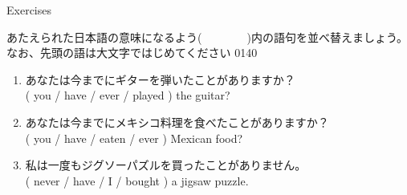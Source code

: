 \documentclass[aspectratio=169,xcolor={dvipsnames,table}]{beamer}
\newcommand{\myaudio}[1]{\href{#1}{\faVolumeUp}}
\begin{document}
\begin{frame}[plain]{Exercises}

{\small あたえられた日本語の意味になるよう(~~~~~~~~)内の語句を並べ替えましょう。なお、先頭の語は大文字ではじめてください}%
\hfill{\tiny 0140}\,{\scriptsize \myaudio{./audio/013_have_pp_keiken_05.mp3}}

\vspace{-10pt}
 \begin{enumerate}
  \item あなたは今までにギターを弾いたことがありますか？\\
( you / have / ever / played ) the guitar?\\
\vspace{-10pt}
  \item あなたは今までにメキシコ料理を食べたことがありますか？\hfill{}\,\,\\
( you / have / eaten / ever ) Mexican food?\\
  \item 私は一度もジグソーパズルを買ったことがありません。\\
( never / have / I / bought ) a jigsaw puzzle.\\
 \end{enumerate}

\vspace{-65pt}

\mbox{}\hfill{}
\end{frame}
\end{document}
